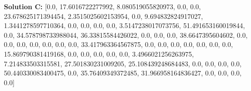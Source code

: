 \documentclass{report}
\begin{document}
\textbf{Solution C:}
[0.0, 17.6016722277992, 8.080519055820973, 0.0, 0.0, 23.678625171394454, 2.3515025602153954, 0.0, 9.694832824917027, 1.3441278597710364, 0.0, 0.0, 0.0, 0.0, 3.5147238017073756, 51.491653160019844, 0.0, 34.578798733988044, 36.33815584426022, 0.0, 0.0, 0.0, 38.6647395604602, 0.0, 0.0, 0.0, 0.0, 0.0, 0.0, 0.0, 33.417963364567875, 0.0, 0.0, 0.0, 0.0, 0.0, 0.0, 0.0, 15.869790381419168, 0.0, 0.0, 0.0, 0.0, 0.0, 3.4966021256263975, 7.214833503315581, 27.501830231009205, 25.108439248684483, 0.0, 0.0, 0.0, 0.0, 50.440330083400475, 0.0, 35.76409349372485, 31.966958164836427, 0.0, 0.0, 0.0, 0.0]
\end{document}
